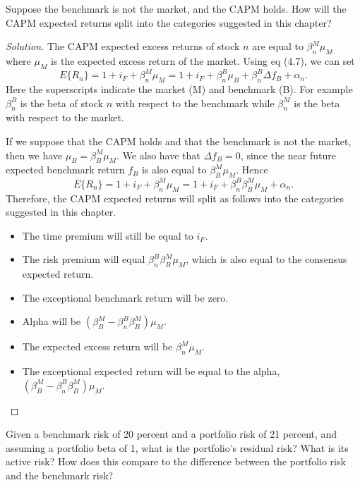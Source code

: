 \begin{problem}{4.2}
 Suppose the benchmark is not the market, and the CAPM holds. How will the CAPM expected returns split into the categories suggested in this chapter?
\end{problem}

\begin{proof}[Solution]
 The CAPM expected excess returns of stock $n$ are equal to $\beta_{n}^{M}\mu_{M}$ where $\mu_{M}$ is the expected excess return of the market. Using eq (4.7), we can set 
 \begin{equation*}
  E\{R_{n}\}=1+i_{F}+\beta_{n}^{M}\mu_{M}=1+i_{F}+\beta_{n}^{B}\mu_{B}+\beta_{n}^{B}\Delta f_{B}+\alpha_{n}.
 \end{equation*}
 Here the superscripts indicate the market (M) and benchmark (B). For example $\beta_{n}^{B}$ is the beta of stock $n$ with respect to the benchmark while $\beta_{n}^{M}$ is the beta with respect to the market.
 
 If we suppose that the CAPM holds and that the benchmark is not the market, then we have $\mu_{B} = \beta_{B}^{M}\mu_{M}$. We also have that $\Delta f_{B} = 0$, since the near future expected benchmark return $f_{B}$ is also equal to $\beta_{B}^{M}\mu_{M}$. Hence \[E\{R_{n}\}=1+i_{F}+\beta_{n}^{M}\mu_{M}=1+i_{F}+\beta_{n}^{B}\beta_{B}^{M}\mu_{M}+\alpha_{n}.\] Therefore, the CAPM expected returns will split as follows into the categories suggested in this chapter.
\begin{itemize}
\item The time premium will still be equal to $i_{F}$.
\item The risk premium will equal $\beta_{n}^{B}\beta_{B}^{M}\mu_{M}$, which is also equal to the consensus expected return.
\item The exceptional benchmark return will be zero.
\item Alpha will be $(\beta_{B}^{M} - \beta_{n}^{B}\beta_{B}^{M})\mu_{M}$.
\item The expected excess return will be $\beta_{n}^{M}\mu_{M}$.
\item The exceptional expected return will be equal to the alpha, $(\beta_{B}^{M} - \beta_{n}^{B}\beta_{B}^{M})\mu_{M}$.
\end{itemize}
\end{proof}

\begin{problem}{4.3}
 Given a benchmark risk of 20 percent and a portfolio risk of 21 percent, and assuming a portfolio beta of 1, what is the portfolio's residual risk? What is its active risk? How does this compare to the difference between the portfolio risk and the benchmark risk?
\end{problem}

